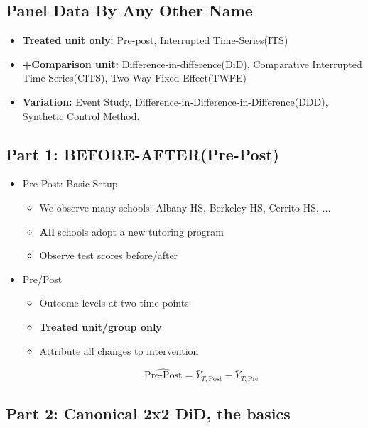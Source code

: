 \subsection*{Panel Data By Any Other Name}

\begin{itemize}
    \item \textbf{Treated unit only:} Pre-post, Interrupted Time-Series(ITS)
    \item \textbf{+Comparison unit:} Difference-in-difference(DiD), Comparative Interrupted Time-Series(CITS), Two-Way Fixed Effect(TWFE)
    \item \textbf{Variation:} Event Study, Difference-in-Difference-in-Difference(DDD), Synthetic Control Method.
\end{itemize}

\subsection*{Part 1: BEFORE-AFTER(Pre-Post)}

\begin{itemize}
    \item Pre-Post: Basic Setup
        \begin{itemize}
            \item We observe many schools: Albany HS, Berkeley HS, Cerrito HS, ...
            \item \textbf{All} schools adopt a new tutoring program
            \item Observe test scores before/after
        \end{itemize}
        
    \item Pre/Post
        \begin{itemize}
            \item Outcome levels at two time points
            \item \textbf{Treated unit/group only}
            \item Attribute all changes to intervention
            
            \[\widehat{\text{Pre-Post}}= \bar{Y}_{T,\text{Post}} - \bar{Y}_{T,\text{Pre}}\]
        \end{itemize}
\end{itemize}

\subsection*{Part 2: Canonical 2x2 DiD, the basics}

